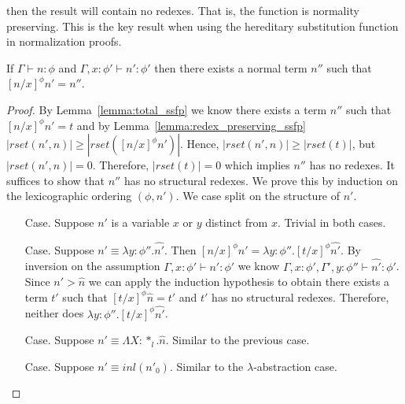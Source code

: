 then the result will contain no redexes.  That is, the function is
normality preserving.  This is the key result when using the
hereditary substitution function in normalization proofs.
\begin{lemma}
  \label{corollary:normalization_preserving_ssfp}
  If $\Gamma \vdash n:\phi$ and $\Gamma, x:\phi' \vdash n':\phi'$ then there exists 
  a normal term $n''$ such that $[n/x]^\phi n' = n''$.
\end{lemma}
\begin{proof}
  By Lemma~\ref{lemma:total_ssfp} we know there exists a term $n''$ such that $[n/x]^\phi n' = t$ and by 
Lemma~\ref{lemma:redex_preserving_ssfp} 
$|rset(n', n)| \geq |rset([n/x]^\phi n')|$.  Hence, $|rset(n', n)| \geq |rset(t)|$, but
$|rset(n', n)| = 0$.  Therefore, $|rset(t)| = 0$ which implies $n''$ has no redexes.  It suffices to show
that $n''$ has no structural redexes.  We prove this by induction on the lexicographic ordering $(\phi,n')$.
We case split on the structure of $n'$.
\begin{itemize}
\item[Case.] Suppose $n'$ is a variable $x$ or $y$ distinct from $x$.  Trivial in both cases.
  
\item[Case.] Suppose $n' \equiv \lambda y:\phi''.\hat{n'}$.  Then
  $[n/x]^\phi n' = \lambda y:\phi''.[t/x]^\phi \hat{n'}$. By inversion on the assumption  
  $\Gamma, x:\phi' \vdash n':\phi'$ we know $\Gamma, x:\phi',\Gamma',y:\phi'' \vdash \hat{n'}:\phi'$.  Since
  $n' > \hat{n}$ we can apply the induction hypothesis to obtain there exists a term $t'$ such that
  $[t/x]^\phi \hat{n} = t'$ and $t'$ has no structural redexes.  Therefore, neither does 
  $\lambda y:\phi''.[t/x]^\phi \hat{n'}$.
  
\item[Case.] Suppose $n' \equiv \Lambda X:*_l.\hat{n}$.  Similar to the previous case.
  
\item[Case.] Suppose $n' \equiv inl(n'_0)$.  Similar to the $\lambda$-abstraction case.
  

\end{itemize}
\end{proof}

